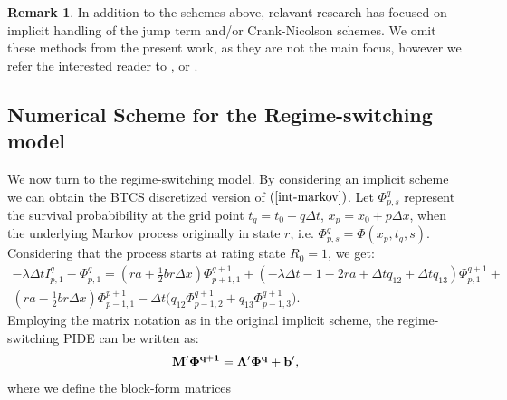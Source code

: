 \documentclass[11pt,reqno]{article}
\theoremstyle{definition}
\newtheorem{remark}[theorem]{Remark}
\begin{document}
\begin{remark}
	In addition to the schemes above, relavant research has focused on implicit handling of the jump term and/or Crank-Nicolson schemes. We omit these methods from the present work, as they are not the main focus, however we refer the interested reader to \cite{d2005robust}, \cite{jwo2020investigation} or \cite{carr2007numerical}. 
\end{remark}

\subsection{Numerical Scheme for the Regime-switching model}
We now turn to the regime-switching model. By considering an implicit scheme we can obtain the BTCS discretized version of $(\ref{int-markov})$. Let $\Phi^q_{p,s}$ represent the survival probabibility at the grid point $t_q=t_0+ q\Delta t$, $x_p=x_0+p\Delta x$, when the underlying Markov process originally in state $r$, i.e. $\Phi^q_{p,s}=\Phi(x_p,t_q,s)$. Considering that the process starts at rating state $R_0=1$, we get:
\begin{eqnarray}
-\lambda \Delta t I^q_{p,1} - \Phi_{p,1}^q = (ra + \frac{1}{2} br \Delta x) \Phi^{q+1}_{p+1,1} + (-\lambda \Delta t - 1 - 2ra + \Delta t q_{12} + \Delta t q_{13}) \Phi_{p,1}^{q+1} +\nonumber\\ (ra-\frac{1}{2}br\Delta x) \Phi_{p-1,1}^{p+1} - \Delta t \big(q_{12} \Phi^{q+1}_{p-1,2} + q_{13} \Phi^{q+1}_{p-1,3}\big).
\end{eqnarray}
Employing the matrix notation as in the original implicit scheme, the regime-switching PIDE can be written as:
\begin{eqnarray} \label{matrix-form}
 \bf{M'}\bf{\Phi}^{q+1} = \bf{\Lambda}' \bf{\Phi}^q+ \bf{b}', 
\end{eqnarray}
where we define the block-form matrices
\end{document}
